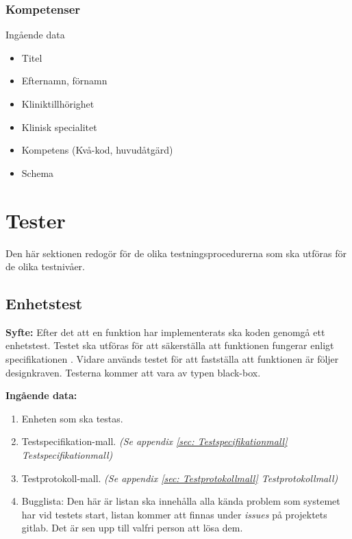 \documentclass[a4paper,10pt, twoside]{article}
\begin{document}
\subsubsection{Kompetenser}
\label{sec: Kompetenser}
Ingående data
\begin{multicols}{2}
\begin{itemize}
	\item Titel
	\item Efternamn, förnamn
	\item Kliniktillhörighet
	\item Klinisk specialitet
	\item Kompetens (Kvå-kod, huvudåtgärd)
	\item Schema
\end{itemize}
\end{multicols}

\section{Tester}
Den här sektionen redogör för de olika testningsprocedurerna som ska utföras för de olika testnivåer.

\subsection{Enhetstest}
\label{sec:Enhetstest}
  \textbf{Syfte:} Efter det att en funktion har implementerats ska koden genomgå ett enhetstest. Testet ska utföras för att säkerställa att funktionen     	   fungerar enligt specifikationen \cite{kravspec}. Vidare används testet för att fastställa att funktionen är följer designkraven. Testerna kommer att 	   vara av typen black-box.

  \textbf{Ingående data:}
    \begin{enumerate}
      \item Enheten som ska testas.
      \item Testspecifikation-mall.
      \emph{(Se appendix \ref{sec: Testspecifikationmall} Testspecifikationmall)}
      \item Testprotokoll-mall. \emph{(Se appendix \ref{sec: Testprotokollmall} Testprotokollmall)}
      \item Bugglista: Den här är listan ska innehålla alla kända problem som
      systemet har vid testets start, listan kommer att finnas under
      \emph{issues} på projektets gitlab. Det är sen upp till valfri person att lösa dem.
    \end{enumerate}
\end{document}

